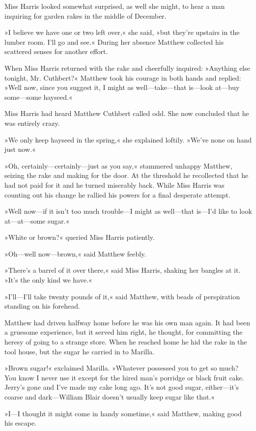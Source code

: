 Miss Harris looked somewhat surprised, as well she might, to hear a man inquiring for garden rakes in the middle of December.

»I believe we have one or two left over,« she said, »but they're upstairs in the lumber room. I'll go and see.« During her absence Matthew collected his scattered senses for another effort.

When Miss Harris returned with the rake and cheerfully inquired: »Anything else tonight, Mr. Cuthbert?« Matthew took his courage in both hands and replied: »Well now, since you suggest it, I might as well—take—that is—look at—buy some—some hayseed.«

Miss Harris had heard Matthew Cuthbert called odd. She now concluded that he was entirely crazy.

»We only keep hayseed in the spring,« she explained loftily. »We've none on hand just now.«

»Oh, certainly—certainly—just as you say,« stammered unhappy Matthew, seizing the rake and making for the door. At the threshold he recollected that he had not paid for it and he turned miserably back. While Miss Harris was counting out his change he rallied his powers for a final desperate attempt.

»Well now—if it isn't too much trouble—I might as well—that is—I'd like to look at—at—some sugar.«

»White or brown?« queried Miss Harris patiently.

»Oh—well now—brown,« said Matthew feebly.

»There's a barrel of it over there,« said Miss Harris, shaking her bangles at it. »It's the only kind we have.«

»I'll—I'll take twenty pounds of it,« said Matthew, with beads of perspiration standing on his forehead.

Matthew had driven halfway home before he was his own man again. It had been a gruesome experience, but it served him right, he thought, for committing the heresy of going to a strange store. When he reached home he hid the rake in the tool house, but the sugar he carried in to Marilla.

»Brown sugar!« exclaimed Marilla. »Whatever possessed you to get so much? You know I never use it except for the hired man's porridge or black fruit cake. Jerry's gone and I've made my cake long ago. It's not good sugar, either—it's coarse and dark—William Blair doesn't usually keep sugar like that.«

»I—I thought it might come in handy sometime,« said Matthew, making good his escape.

